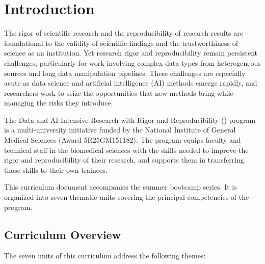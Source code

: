 \chapter*{Introduction}
\label{chap:intro}

The rigor of scientific research and the reproducibility of research results are foundational to the validity of scientific findings and the trustworthiness of science as an institution. Yet research rigor and reproducibility remain persistent challenges, particularly for work involving complex data types from heterogeneous sources and long data manipulation pipelines. These challenges are especially acute as data science and artificial intelligence (AI) methods emerge rapidly, and researchers work to seize the opportunities that new methods bring while managing the risks they introduce.

The Data and AI Intensive Research with Rigor and Reproducibility (\DAIR{}) program is a multi-university initiative funded by the National Institute of General Medical Sciences (Award 5R25GM151182). The program equips faculty and technical staff in the biomedical sciences with the skills needed to improve the rigor and reproducibility of their research, and supports them in transferring those skills to their own trainees.

This curriculum document accompanies the \DAIR{} summer bootcamp series. It is organized into seven thematic units covering the principal competencies of the program.

\section*{Curriculum Overview}
\label{sec:intro-overview}

The seven units of this curriculum address the following themes:

